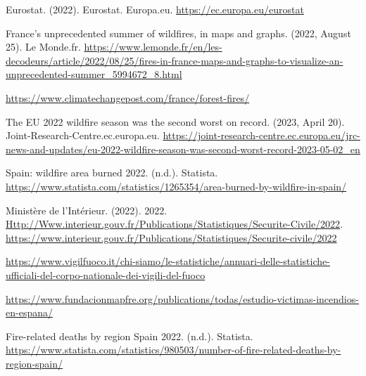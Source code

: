 \documentclass[
]{article}
\begin{document}
Eurostat. (2022). Eurostat. Europa.eu.
\url{https://ec.europa.eu/eurostat}

France's unprecedented summer of wildfires, in maps and graphs. (2022,
August 25). Le Monde.fr.
\url{https://www.lemonde.fr/en/les-decodeurs/article/2022/08/25/fires-in-france-maps-and-graphs-to-visualize-an-unprecedented-summer_5994672_8.html}

\url{https://www.climatechangepost.com/france/forest-fires/}

The EU 2022 wildfire season was the second worst on record. (2023, April
20). Joint-Research-Centre.ec.europa.eu.
\url{https://joint-research-centre.ec.europa.eu/jrc-news-and-updates/eu-2022-wildfire-season-was-second-worst-record-2023-05-02_en}

Spain: wildfire area burned 2022. (n.d.). Statista.
\url{https://www.statista.com/statistics/1265354/area-burned-by-wildfire-in-spain/}

Ministère de l'Intérieur. (2022). 2022.
\url{Http://Www.interieur.gouv.fr/Publications/Statistiques/Securite-Civile/2022}.
\url{https://www.interieur.gouv.fr/Publications/Statistiques/Securite-civile/2022}

\url{https://www.vigilfuoco.it/chi-siamo/le-statistiche/annuari-delle-statistiche-ufficiali-del-corpo-nationale-dei-vigili-del-fuoco}

\url{https://www.fundacionmapfre.org/publications/todas/estudio-victimas-incendios-en-espana/}

Fire-related deaths by region Spain 2022. (n.d.). Statista.
\url{https://www.statista.com/statistics/980503/number-of-fire-related-deaths-by-region-spain/}
\end{document}
